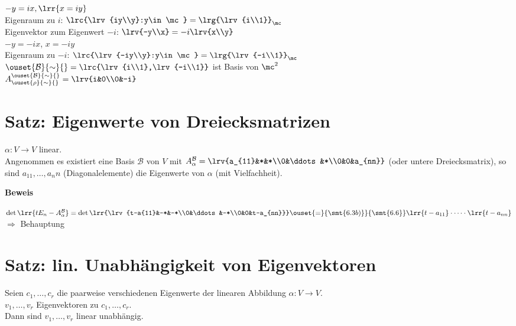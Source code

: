 \begin{enumerate}[a)]
    	  $-y=ix,\lrr{x=iy}$\\
    	  Eigenraum zu $i$: $\lrc{\lrv{iy\\y}:y\in\mc}=\lrg{\lrv{i\\1}}_\mc$\\
    	  Eigenvektor zum Eigenwert $-i$: $\lrv{-y\\x}=-i\lrv{x\\y}$\\
    	  $-y=-ix$, $x=-iy$\\
    	  Eigenraum zu $-i$: $\lrc{\lrv{-iy\\y}:y\in\mc}=\lrg{\lrv{-i\\1}}_\mc$\\
    	  $\ouset{\mathcal{B}}{\sim}{}=\lrc{\lrv{i\\1},\lrv{-i\\1}}$ ist Basis von $\mc^2$\\
    	  $A_{\ouset{\rho}{\sim}{}}^{\ouset{\mathcal{B}}{\sim}{}}=\lrv{i&0\\0&-i}$  
  \end{enumerate}

\section{Satz: Eigenwerte von Dreiecksmatrizen}
	$\alpha:V\rightarrow V$ linear.\\
	Angenommen es existiert eine Basis $\mathcal{B}$ von $V$ mit $A_\alpha^\mathcal{B}=\lrv{a_{11}&*&*\\0&\ddots&*\\0&0&a_{nn}}$ (oder untere Dreiecksmatrix), so sind $a_{11},\dots,{a_nn}$ (Diagonalelemente) die Eigenwerte von $\alpha$ (mit Vielfachheit).

	\textbf{Beweis}

	$\det\lrr{tE_n-A_\alpha^{\mathcal{B}}}=\det\lrr{\lrv{t-a{11}&-*&-*\\0&\ddots&-*\\0&0&t-a_{nn}}}\ouset{=}{\smt{6.3b)}}{\smt{6.6}}\lrr{t-a_{11}}\cdot\dots\cdot\lrr{t-a_{nn}}$\\
	$\Rightarrow$ Behauptung

\section{Satz: lin. Unabhängigkeit von Eigenvektoren}
	Seien $c_1,\dots,c_r$ die paarweise verschiedenen Eigenwerte der linearen Abbildung $\alpha: V\rightarrow V$.\\
	$v_1,\dots,v_r$ Eigenvektoren zu $c_1,\dots,c_r$.\\
	Dann sind $v_1,\dots,v_r$ linear unabhängig.

